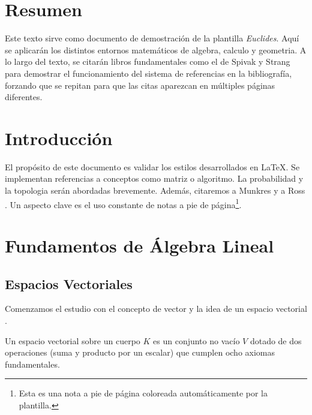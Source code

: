 	
	\frontmatter %
	\tableofcontents
	\chapter*{Resumen}
	
	Este texto sirve como documento de demostración de la plantilla \textit{Euclides}. Aquí se aplicarán los distintos entornos matemáticos de \gls{algebra}, \gls{calculo} y \gls{geometria}. A lo largo del texto, se citarán libros fundamentales como el de Spivak \cite{spivak} y Strang \cite{strang} para demostrar el funcionamiento del sistema de referencias en la bibliografía, forzando que se repitan para que las citas aparezcan en múltiples páginas diferentes.
	
	\chapter*{Introducción}
	
	El propósito de este documento es validar los estilos desarrollados en \LaTeX. Se implementan referencias a conceptos como \gls{matriz} o \gls{algoritmo}. La \gls{probabilidad} y la \gls{topologia} serán abordadas brevemente. Además, citaremos a Munkres \cite{munkres} y a Ross \cite{ross}. Un aspecto clave es el uso constante de notas a pie de página\footnote{Esta es una nota a pie de página coloreada automáticamente por la plantilla.}.
	
	
	\mainmatter %
	
	\chapter{Fundamentos de Álgebra Lineal}
	
	\section{Espacios Vectoriales}
	Comenzamos el estudio con el concepto de \gls{vector} y la idea de un \gls{espacio} vectorial \cite{anton}. 
	
	\begin{definition}
		Un espacio vectorial sobre un cuerpo $K$ es un conjunto no vacío $V$ dotado de dos operaciones (suma y producto por un escalar) que cumplen ocho \glspl{axioma} fundamentales.
	\end{definition}
	
